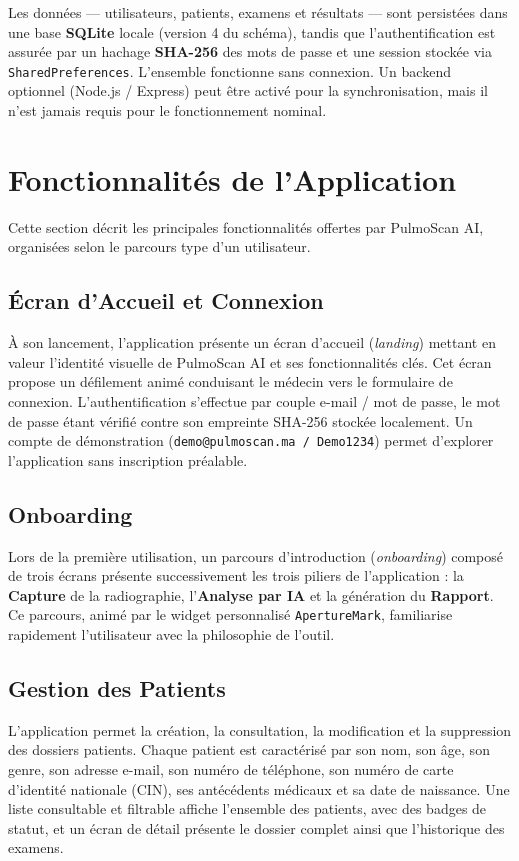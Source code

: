 \documentclass[12pt,a4paper]{report}
\begin{document}
\medskip
Les données --- utilisateurs, patients, examens et résultats --- sont persistées dans une base \textbf{SQLite} locale (version 4 du schéma), tandis que l'authentification est assurée par un hachage \textbf{SHA-256} des mots de passe et une session stockée via \texttt{SharedPreferences}. L'ensemble fonctionne sans connexion. Un backend optionnel (Node.js / Express) peut être activé pour la synchronisation, mais il n'est jamais requis pour le fonctionnement nominal.

\section{Fonctionnalités de l'Application}
Cette section décrit les principales fonctionnalités offertes par PulmoScan AI, organisées selon le parcours type d'un utilisateur.

\subsection{Écran d'Accueil et Connexion}
À son lancement, l'application présente un écran d'accueil (\textit{landing}) mettant en valeur l'identité visuelle de PulmoScan AI et ses fonctionnalités clés. Cet écran propose un défilement animé conduisant le médecin vers le formulaire de connexion. L'authentification s'effectue par couple e-mail / mot de passe, le mot de passe étant vérifié contre son empreinte SHA-256 stockée localement. Un compte de démonstration (\texttt{demo@pulmoscan.ma / Demo1234}) permet d'explorer l'application sans inscription préalable.

\subsection{Onboarding}
Lors de la première utilisation, un parcours d'introduction (\textit{onboarding}) composé de trois écrans présente successivement les trois piliers de l'application : la \textbf{Capture} de la radiographie, l'\textbf{Analyse par IA} et la génération du \textbf{Rapport}. Ce parcours, animé par le widget personnalisé \texttt{ApertureMark}, familiarise rapidement l'utilisateur avec la philosophie de l'outil.

\subsection{Gestion des Patients}
L'application permet la création, la consultation, la modification et la suppression des dossiers patients. Chaque patient est caractérisé par son nom, son âge, son genre, son adresse e-mail, son numéro de téléphone, son numéro de carte d'identité nationale (CIN), ses antécédents médicaux et sa date de naissance. Une liste consultable et filtrable affiche l'ensemble des patients, avec des badges de statut, et un écran de détail présente le dossier complet ainsi que l'historique des examens.
\end{document}
